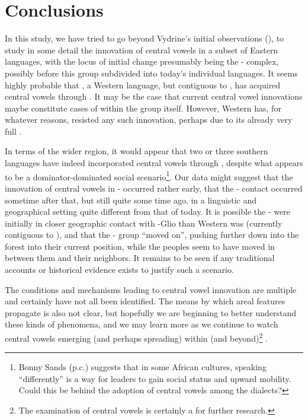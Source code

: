 \documentclass[output=paper
,newtxmath
,modfonts
,nonflat]{langsci/langscibook}
\begin{document}
\section{Conclusions}\label{sec:zogbo:7} 

In this study, we have tried to go beyond Vydrine’s initial observations (\citeyear{Vydrine2009}), to study in some detail the innovation of central vowels in a subset of Eastern  languages, with the locus of initial change presumably being the -  complex, possibly before this group subdivided into today’s individual languages. It seems highly probable that , a Western  language, but contiguous to , has acquired central vowels through .  It may be the case that current central vowel innovations maybe constitute cases of  within the  group itself. However, Western  has, for whatever reasons, resisted any such innovation, perhaps due to its already very full .  

In terms of the wider region, it would appear that two or three southern  languages have indeed incorporated central vowels through , despite what appears to be a dominator-dominated social scenario\footnote{Bonny Sands (p.c.) suggests that in some African cultures, speaking “differently” is a way for leaders to gain social status and upward mobility.  Could this be behind the adoption of  central vowels among the  dialects?}.  Our data might suggest that the innovation of central vowels in - occurred rather early, that the - contact occurred sometime after that, but still quite some time ago, in a linguistic and geographical setting quite different from that of today.  It is possible the -  were initially in closer geographic contact with -Glio than Western  was (currently contiguous to ), and that the -  group “moved on”, pushing further down into the forest into their current position, while the  peoples seem to have moved in between them and their  neighbors. It remains to be seen if any traditional accounts or historical evidence exists to justify such a scenario.  

The conditions and mechanisms leading to central vowel innovation are multiple and certainly have not all been identified.  The means by which areal features propagate is also not clear, but hopefully we are beginning to better understand these kinds of phenomena, and we may learn more as we continue to watch central vowels emerging (and perhaps spreading) within  (and beyond)\footnote{The examination of  central vowels is certainly a  for further research.} . 
\end{document}
